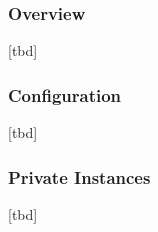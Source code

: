 

\subsubsection{Overview}

[tbd]




\subsubsection{Configuration}

[tbd]





\subsubsection{Private Instances}

[tbd]
















